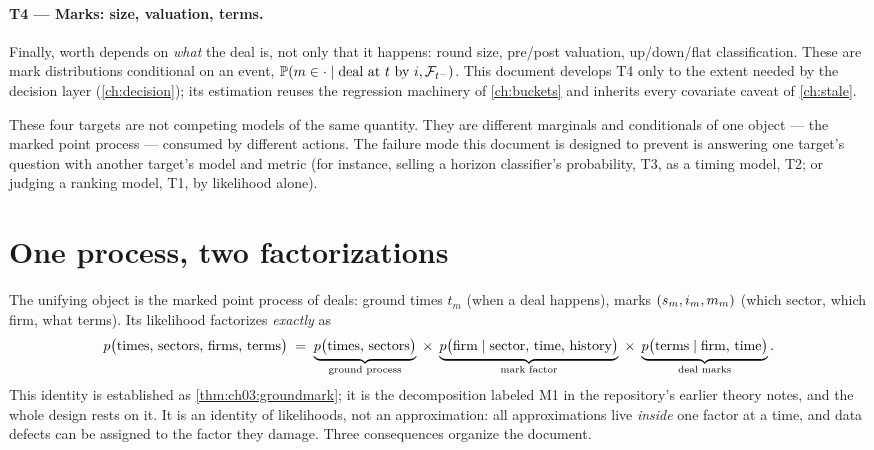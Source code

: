 \paragraph{T4 --- Marks: size, valuation, terms.}
Finally, worth depends on \emph{what} the deal is, not only that it happens:
round size, pre/post valuation, up/down/flat classification. These are mark
distributions conditional on an event, $\mathbb{P}(m \in \cdot \mid
\text{deal at } t \text{ by } i, \mathcal{F}_{t^-})$. This document develops T4 only to
the extent needed by the decision layer (\cref{ch:decision}); its
estimation reuses the regression machinery of \cref{ch:buckets} and
inherits every covariate caveat of \cref{ch:stale}.

These four targets are not competing models of the same quantity. They are
different marginals and conditionals of one object --- the marked point
process --- consumed by different actions. The failure mode this document
is designed to prevent is answering one target's question with another
target's model and metric (for instance, selling a horizon classifier's
probability, T3, as a timing model, T2; or judging a ranking model, T1, by
likelihood alone).

\section{One process, two factorizations}\label{ch01:sec:factorization}

The unifying object is the marked point process of deals: ground times $t_m$
(when a deal happens), marks $(s_m, i_m, m_m)$ (which sector, which
firm, what terms). Its likelihood factorizes \emph{exactly} as
\begin{equation}\label{eq:ch01:groundmark}
p\big(\text{times, sectors, firms, terms}\big)
 \;=\;
 \underbrace{p\big(\text{times, sectors}\big)}_{\text{ground process}}
 \;\times\;
 \underbrace{p\big(\text{firm} \mid \text{sector, time, history}\big)}_{\text{mark factor}}
 \;\times\;
 \underbrace{p\big(\text{terms} \mid \text{firm, time}\big)}_{\text{deal marks}} .
\end{equation}
This identity is established as \cref{thm:ch03:groundmark}; it is the
decomposition labeled M1 in the repository's earlier theory notes, and the
whole design rests on it. It is an identity of likelihoods, not an
approximation: all approximations live \emph{inside} one factor at a time,
and data defects can be assigned to the factor they damage. Three
consequences organize the document.

